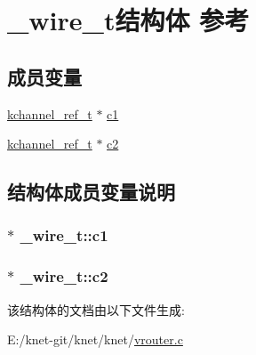 \hypertarget{a00041}{}\section{\+\_\+wire\+\_\+t结构体 参考}
\label{a00041}
\subsection*{成员变量}
\begin{DoxyCompactItemize}
\item 
\hyperlink{a00056_a3b7e82599367eade261456f60ebe2cd9_a3b7e82599367eade261456f60ebe2cd9}{kchannel\+\_\+ref\+\_\+t} $\ast$ \hyperlink{a00041_a7da02688b9b074c535d87309d6fea3df_a7da02688b9b074c535d87309d6fea3df}{c1}
\item 
\hyperlink{a00056_a3b7e82599367eade261456f60ebe2cd9_a3b7e82599367eade261456f60ebe2cd9}{kchannel\+\_\+ref\+\_\+t} $\ast$ \hyperlink{a00041_a4c7d438d47a605eb56fc5576c13ae97f_a4c7d438d47a605eb56fc5576c13ae97f}{c2}
\end{DoxyCompactItemize}


\subsection{结构体成员变量说明}
\hypertarget{a00041_a7da02688b9b074c535d87309d6fea3df_a7da02688b9b074c535d87309d6fea3df}{}
\subsubsection[{c1}]{$\ast$ \+\_\+wire\+\_\+t\+::c1}\label{a00041_a7da02688b9b074c535d87309d6fea3df_a7da02688b9b074c535d87309d6fea3df}
\hypertarget{a00041_a4c7d438d47a605eb56fc5576c13ae97f_a4c7d438d47a605eb56fc5576c13ae97f}{}
\subsubsection[{c2}]{$\ast$ \+\_\+wire\+\_\+t\+::c2}\label{a00041_a4c7d438d47a605eb56fc5576c13ae97f_a4c7d438d47a605eb56fc5576c13ae97f}


该结构体的文档由以下文件生成\+:\begin{DoxyCompactItemize}
\item 
E\+:/knet-\/git/knet/knet/\hyperlink{a00109}{vrouter.\+c}\end{DoxyCompactItemize}

